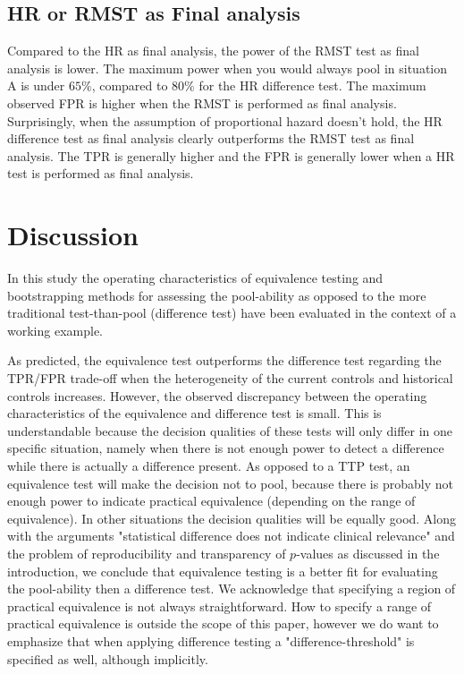 \documentclass[Royal,sagev,times]{sagej}
\begin{document}
\subsection{HR or RMST as Final analysis}
Compared to the HR as final analysis, the power of the RMST test as final analysis is lower. The maximum power when you would always pool in situation A is under $65\%$, compared to $80\%$ for the HR difference test. The maximum observed FPR is higher when the RMST is performed as final analysis. Surprisingly, when the assumption of proportional hazard doesn't hold, the HR difference test as final analysis clearly outperforms the RMST test as final analysis. The TPR is generally higher and the FPR is generally lower when a HR test is performed as final analysis. 

\section{Discussion}
In this study the operating characteristics of equivalence testing and bootstrapping methods for assessing the pool-ability as opposed to the more traditional test-than-pool (difference test) have been evaluated in the context of a working example. 

As predicted, the equivalence test outperforms the difference test regarding the TPR/FPR trade-off when the heterogeneity of the current controls and historical controls increases. However, the observed discrepancy between the operating characteristics of the equivalence and difference test is small. This is understandable because the decision qualities of these tests will only differ in one specific situation, namely when there is not enough power to detect a difference while there is actually a difference present. As opposed to a TTP test, an equivalence test will make the decision not to pool, because there is probably not enough power to indicate practical equivalence (depending on the range of equivalence). In other situations the decision qualities will be equally good. Along with the arguments "statistical difference does not indicate clinical relevance" and the problem of reproducibility and transparency of $p$-values as discussed in the introduction, we conclude that equivalence testing is a better fit for evaluating the pool-ability then a difference test. We acknowledge that specifying a region of practical equivalence is not always straightforward. How to specify a range of practical equivalence is outside the scope of this paper, however we do want to emphasize that when applying difference testing a "difference-threshold" is specified as well, although implicitly. \\
\end{document}
